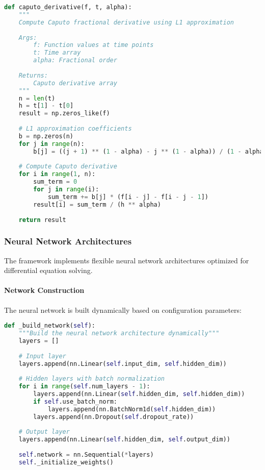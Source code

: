 \begin{lstlisting}[language=Python, caption=Caputo Derivative Implementation]
def caputo_derivative(f, t, alpha):
    """
    Compute Caputo fractional derivative using L1 approximation
    
    Args:
        f: Function values at time points
        t: Time array
        alpha: Fractional order
    
    Returns:
        Caputo derivative array
    """
    n = len(t)
    h = t[1] - t[0]
    result = np.zeros_like(f)
    
    # L1 approximation coefficients
    b = np.zeros(n)
    for j in range(n):
        b[j] = ((j + 1) ** (1 - alpha) - j ** (1 - alpha)) / (1 - alpha)
    
    # Compute Caputo derivative
    for i in range(1, n):
        sum_term = 0
        for j in range(i):
            sum_term += b[j] * (f[i - j] - f[i - j - 1])
        result[i] = sum_term / (h ** alpha)
    
    return result
\end{lstlisting}

\subsubsection{Neural Network Architectures}

The framework implements flexible neural network architectures optimized for differential equation solving.

\paragraph{Network Construction}
The neural network is built dynamically based on configuration parameters:

\begin{lstlisting}[language=Python, caption=Neural Network Construction]
def _build_network(self):
    """Build the neural network architecture dynamically"""
    layers = []
    
    # Input layer
    layers.append(nn.Linear(self.input_dim, self.hidden_dim))
    
    # Hidden layers with batch normalization
    for i in range(self.num_layers - 1):
        layers.append(nn.Linear(self.hidden_dim, self.hidden_dim))
        if self.use_batch_norm:
            layers.append(nn.BatchNorm1d(self.hidden_dim))
        layers.append(nn.Dropout(self.dropout_rate))
    
    # Output layer
    layers.append(nn.Linear(self.hidden_dim, self.output_dim))
    
    self.network = nn.Sequential(*layers)
    self._initialize_weights()
\end{lstlisting}

